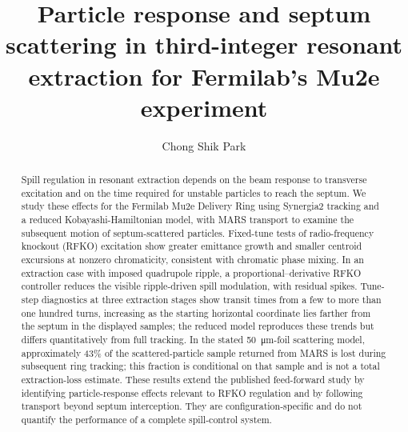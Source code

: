 \documentclass[a4paper,fleqn]{cas-sc}
\def\corref#1{}%
\def\fnref#1{}%
\begin{document}
\let\WriteBookmarks\relax

\let\printorcid\relax

\title [mode = title] {Particle response and septum scattering in third-integer resonant extraction for Fermilab's Mu2e experiment}
\author[1,2]{Chong Shik Park\corref{cor1}\fnref{fn1}}




\begin{abstract}
Spill regulation in resonant extraction depends on the beam response to transverse excitation and on the time required for unstable particles to reach the septum. We study these effects for the Fermilab Mu2e Delivery Ring using Synergia2 tracking and a reduced Kobayashi-Hamiltonian model, with MARS transport to examine the subsequent motion of septum-scattered particles. Fixed-tune tests of radio-frequency knockout (RFKO) excitation show greater emittance growth and smaller centroid excursions at nonzero chromaticity, consistent with chromatic phase mixing. In an extraction case with imposed quadrupole ripple, a proportional--derivative RFKO controller reduces the visible ripple-driven spill modulation, with residual spikes. Tune-step diagnostics at three extraction stages show transit times from a few to more than one hundred turns, increasing as the starting horizontal coordinate lies farther from the septum in the displayed samples; the reduced model reproduces these trends but differs quantitatively from full tracking. In the stated \SI{50}{\micro\metre}-foil scattering model, approximately 43\% of the scattered-particle sample returned from MARS is lost during subsequent ring tracking; this fraction is conditional on that sample and is not a total extraction-loss estimate. These results extend the published feed-forward study by identifying particle-response effects relevant to RFKO regulation and by following transport beyond septum interception. They are configuration-specific and do not quantify the performance of a complete spill-control system.
\end{abstract}
\end{document}

